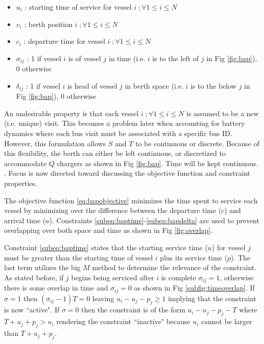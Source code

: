 \documentclass[letterpaper, 10pt, conference]{IEEEtran}
\begin{document}
\begin{itemize}
    \item \(u_i\)         : starting time of service for vessel \(i\;; \forall 1 \leq i \leq N\)
    \item \(v_i\)         : berth position \(i\;; \forall 1 \leq i \leq N\)
    \item \(c_i\)         : departure time for vessel \(i\;; \forall 1 \leq i \leq N\)
    \item \(\sigma_{ij}\) : 1 if vessel \(i\) is of vessel \(j\) in time (i.e. \(i\) is to the left of \(j\) in Fig \ref{fig:bap}), 0 otherwise
    \item \(\delta_{ij}\) : 1 if vessel \(i\) is head of vessel \(j\) in berth space (i.e. \(i\) is to the below \(j\) in Fig \ref{fig:bap}), 0 otherwise
\end{itemize}

An undesirable property is that each vessel \(i\;; \forall 1 \leq i \leq N\) is assumed to be a new (i.e. unique) visit. This becomes a problem later when accounting for battery dynamics where each bus visit must be associated with a specific bus ID. However, this formulation allows \(S\) and \(T\) to be continuous or discrete. Because of this flexibility, the berth can either be left continuous, or discretized to accommodate \(Q\) chargers as shown in Fig \ref{fig:bap}. Time will be kept continuous. \cite{Buhrkal2010}. Focus is now directed toward discussing the objective function and constraint properties.

The objective function \ref{eq:bapobjective} minimizes the time spent to service each vessel by minimizing over the difference between the departure time (\(c\)) and arrival time (\(a\)). Constraints \ref{subeq:baptime}-\ref{subeq:bapdelta} are used to prevent overlapping over both space and time as shown in Fig \ref{fig:overlap}.

Constraint \ref{subeq:baptime} states that the starting service time (\(u\)) for vessel \(j\) must be greater than the starting time of vessel \(i\) plus its service time (\(p\)). The last term utilizes the big \(M\) method to determine the relevance of the constraint. As stated before, if \(j\) begins being serviced after \(i\) is complete \(\sigma_{ij} = 1\), otherwise there is some overlap in time and \(\sigma_{ij} = 0\) as shown in Fig \ref{subfig:timeoverlap}. If \(\sigma = 1\) then \((\sigma_{ij} - 1)T = 0\) leaving \(u_i - u_j - p_j \geq 1\) implying that the constraint is now ``active". If \(\sigma = 0\) then the constraint is of the form \(u_i - u_j - p_j - T\) where \(T + u_j + p_j > u_i\) rendering the constraint ``inactive" because \(u_i\) cannot be larger than \(T + u_j + p_j\).
\end{document}
